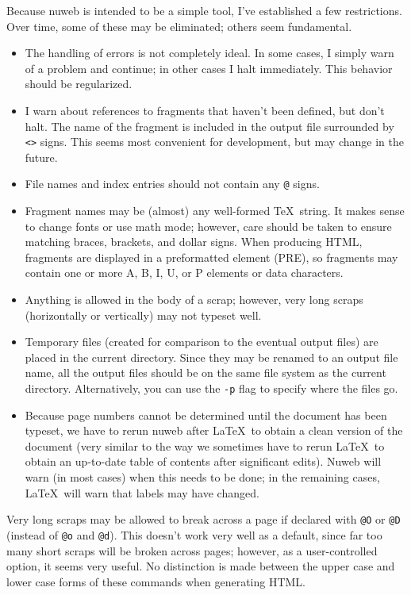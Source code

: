 \documentclass[a4paper]{report}
\begin{document}
Because nuweb is intended to be a simple tool, I've established a few
restrictions. Over time, some of these may be eliminated; others seem
fundamental.
\begin{itemize}
\item The handling of errors is not completely ideal. In some cases, I
  simply warn of a problem and continue; in other cases I halt
  immediately. This behavior should be regularized.
\item I warn about references to fragments that haven't been defined, but
  don't halt. The name of the fragment is included in the output file
  surrounded by \verb|<>| signs.
  This seems most convenient for development, but may change
  in the future.
\item File names and index entries should not contain any \verb|@|
  signs.
\item Fragment names may be (almost) any well-formed \TeX\ string.
  It makes sense to change fonts or use math mode; however, care should
  be taken to ensure matching braces, brackets, and dollar signs.
  When producing HTML, fragments are displayed in a preformatted element
  (PRE), so fragments may contain one or more A, B, I, U, or P elements
  or data characters.
\item Anything is allowed in the body of a scrap; however, very
  long scraps (horizontally or vertically) may not typeset well.
\item Temporary files (created for comparison to the eventual
  output files) are placed in the current directory. Since they may be
  renamed to an output file name, all the output files should be on the
  same file system as the current directory. Alternatively, you can
  use the \verb|-p| flag to specify where the files go.
\item Because page numbers cannot be determined until the document has
  been typeset, we have to rerun nuweb after \LaTeX\ to obtain a clean
  version of the document (very similar to the way we sometimes have
  to rerun \LaTeX\ to obtain an up-to-date table of contents after
  significant edits).  Nuweb will warn (in most cases) when this needs
  to be done; in the remaining cases, \LaTeX\ will warn that labels
  may have changed.
\end{itemize}
Very long scraps may be allowed to break across a page if declared
with \verb|@O| or \verb|@D| (instead of \verb|@o| and \verb|@d|).
This doesn't work very well as a default, since far too many short
scraps will be broken across pages; however, as a user-controlled
option, it seems very useful.  No distinction is made between the
upper case and lower case forms of these commands when generating
HTML\@.
\end{document}
